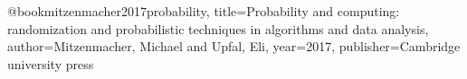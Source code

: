 @book{mitzenmacher2017probability,
  title={Probability and computing: randomization and probabilistic techniques in algorithms and data analysis},
  author={Mitzenmacher, Michael and Upfal, Eli},
  year={2017},
  publisher={Cambridge university press}
}